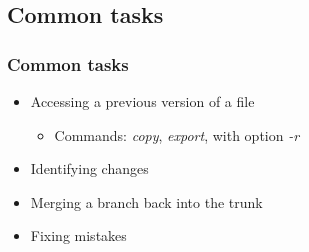 \documentclass{beamer}
\begin{document}
\subsection{Common tasks}

\frame
{
  \frametitle{Common tasks}
  
  \begin{itemize}
  \item<1-> Accessing a previous version of a file
  	\begin{itemize}
	\item<1-> Commands: \textit{copy}, \textit{export}, with option \textit{-r}
	\end{itemize}
  \item<2-> Identifying changes
  \item<3-> Merging a branch back into the trunk
  \item<4-> Fixing mistakes
  \end{itemize}
  
}  
\end{document}
